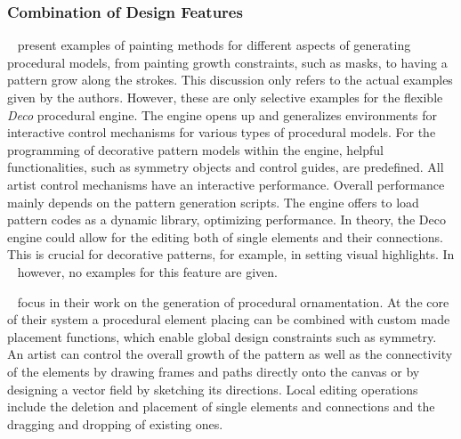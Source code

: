 


\subsubsection{Combination of Design Features}
\label{subsubsec:analysis_combination_of_design_features}



\citeauthor*{mech_2012_tdf}~\cite{mech_2012_tdf} present examples of painting methods for different aspects of generating procedural models, from painting growth constraints, such as masks, to having a pattern grow along the strokes. This discussion only refers to the actual examples given by the authors. However, these are only selective examples for the flexible \textit{Deco} procedural engine. The engine opens up and generalizes environments for interactive control mechanisms for various types of procedural models. For the programming of decorative pattern models within the engine, helpful functionalities, such as symmetry objects and control guides, are predefined. All artist control mechanisms have an interactive performance. Overall performance mainly depends on the pattern generation scripts. The engine offers to load pattern codes as a dynamic library, optimizing performance. In theory, the Deco engine could allow for the editing both of single elements and their connections. This is crucial for decorative patterns, for example, in setting visual highlights. In \citeauthor*{mech_2012_tdf}~\cite{mech_2012_tdf} however, no examples for this feature are given. 

\citeauthor*{gieseke_2017_ooo}~\cite{gieseke_2017_ooo} focus in their work on the generation of procedural ornamentation. At the core of their system a procedural element placing can be combined with custom made placement functions, which enable global design constraints such as symmetry. An artist can control the overall growth of the pattern as well as the connectivity of the elements by drawing frames and paths directly onto the canvas or by designing a vector field by sketching its directions. Local editing operations include the deletion and placement of single elements and connections and the dragging and dropping of existing ones.



